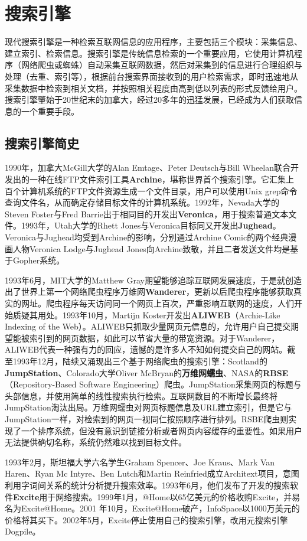 \chapter{搜索引擎}
现代搜索引擎是一种检索互联网信息的应用程序，主要包括三个模块：采集信息、建立索引、检索信息。搜索引擎是传统信息检索的一个重要应用，它使用计算机程序（网络爬虫或蜘蛛）自动采集互联网数据，然后对采集到的信息进行合理组织与处理（去重、索引等），根据前台搜索界面接收到的用户检索需求，即时迅速地从采集数据中检索到相关文档，并按照相关程度由高到低以列表的形式反馈给用户。搜索引擎肇始于20世纪末的加拿大，经过20多年的迅猛发展，已经成为人们获取信息的一个重要手段。

\ornamento
\section{搜索引擎简史}
1990年，加拿大McGill大学的Alan Emtage、Peter Deutsch与Bill Wheelan联合开发出的一种在线FTP文件索引工具\textbf{Archine}，堪称世界首个搜索引擎。它汇集上百个计算机系统的FTP文件资源生成一个文件目录，用户可以使用Unix grep命令查询文件名，从而确定存储目标文件的计算机系统。1992年，Nevada大学的Steven Foster与Fred Barrie出于相同目的开发出\textbf{Veronica}，用于搜索普通文本文件。1993年，Utah大学的Rhett Jones与Veronica目标同又开发出\textbf{Jughead}。Veronica与Jughead均受到Archine的影响，分别通过Archine Comic的两个经典漫画人物Veronica Lodge与Jughead Jones向Archine致敬，并且二者发送文件均是基于Gopher系统。

1993年6月，MIT大学的Matthew Gray期望能够追踪互联网发展速度，于是就创造出了世界上第一个网络爬虫程序万维网\textbf{Wanderer}，更新以后爬虫程序能够获取真实的网址。爬虫程序每天访问同一个网页上百次，严重影响互联网的速度，人们开始质疑其用处。1993年10月，Martijn Koster开发出\textbf{ALIWEB}（Archie-Like Indexing of the Web）。ALIWEB只抓取少量网页元信息的，允许用户自己提交期望能被索引到的网页数据，如此可以节省大量的带宽资源。对于Wanderer，ALIWEB代表一种强有力的回应，遗憾的是许多人不知如何提交自己的网站。截至1993年12月，陆续又涌现出三个基于网络爬虫的搜索引擎：Scotland的\textbf{JumpStation}、Colorado大学Oliver McBryan的\textbf{万维网蠕虫}、NASA的\textbf{RBSE}（Repository-Based Software Engineering）爬虫。JumpStation采集网页的标题与头部信息，并使用简单的线性搜索执行检索。互联网数目的不断增长最终将JumpStation淘汰出局。万维网蠕虫对网页标题信息及URL建立索引，但是它与JumpStation一样，对检索到的网页一视同仁按照顺序进行排列。RSBE爬虫则实现了一个排序系统，但没有意识到链接分析或者网页内容缓存的重要性。如果用户无法提供确切名称，系统仍然难以找到目标文件。

1993年2月，斯坦福大学六名学生Graham Spencer、Joe Kraus、Mark Van Haren、Ryan Mc Intyre、Ben Lutch和Martin Reinfried成立Architext项目，意图利用字词间关系的统计分析提升搜索效率。1993年6月，他们发布了开发的搜索软件\textbf{Excite}用于网络搜索。1999年1月，@Home以65亿美元的价格收购Excite，并易名为Excite@Home。2001 年10月，Excite@Home破产，InfoSpace以1000万美元的价格将其买下。2002年5月，Excite停止使用自己的搜索引擎，改用元搜索引擎Dogpile。

